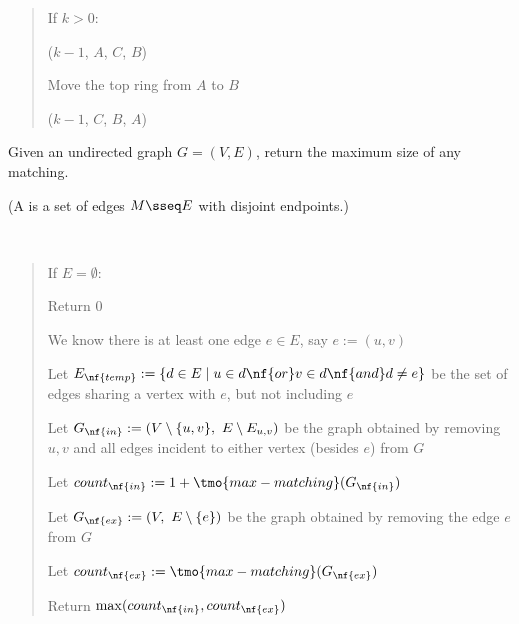\documentclass[10pt]{article}
\begin{document}
\begin{solution}
\begin{quote}
%

\begin{steps}
  \item If $k > 0$:
    \begin{steps}
    \item {}($k-1$, $A$, $C$, $B$)
    \item Move the top ring from $A$ to $B$
    \item {}($k-1$, $C$, $B$, $A$)
    \end{steps}
\end{steps}
\end{quote}
\end{solution}
\pagebreak

Given an undirected graph $ G = (V, E) $, return the maximum size of any matching.

(A  is a set of edges $M \sseq E$ with disjoint endpoints.)

\begin{solution}\ %
\begin{quote}%
\noindent{}%

%

\begin{steps}
  \item If $E = \emptyset$:
    \begin{steps}
    \item Return 0
    \end{steps}
  \item We know there is at least one edge $ e \in E $, say $ e := (u, v) $
  \item Let $ E_{\nf{temp}} := \{d\in E \mid u\in d \nf{ or } v\in d \nf{ and } d\neq e\} $ be the set of edges sharing a vertex with $ e $, but not including $ e $
  \item Let $ G_{\nf{in}} := (V\setminus \{u,v\},\ E\setminus E_{u,v})$ be the graph obtained by removing  $ u,v $ and all edges incident to either vertex (besides $ e $) from $ G $
  \item Let $ count_{\nf{in}} := 1+\tmo{max-matching}(G_{\nf{in}})$ 
  \item Let $ G_{\nf{ex}} := (V,\ E\setminus\{e\}) $ be the graph obtained by removing the edge $ e $ from $ G $
  \item Let $ count_{\nf{ex}} := \tmo{max-matching}(G_{\nf{ex}}) $ 
  \item Return $\max(count_{\nf{in}}, count_{\nf{ex}})$
\end{steps}
\end{quote}%
\end{solution}%
\pagebreak
\end{document}
